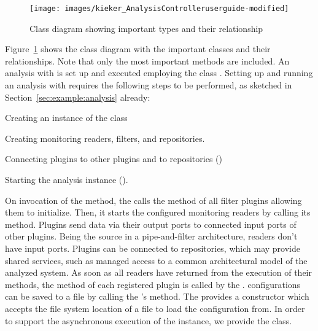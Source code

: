 \begin{figure}\centering
\texttt{[image: images/kieker\_AnalysisControlleruserguide-modified]}
\caption{Class diagram showing important \KiekerAnalysisPart{} types and their relationship}
\label{fig:analysisController:classdiagram}
\end{figure}


\noindent Figure~\ref{fig:analysisController:classdiagram} shows the class diagram %
with the important \KiekerAnalysisPart{} classes and their relationships. %
Note that only the most important methods are included. 
An analysis with \KiekerAnalysisPart{} is set up and executed employing %
the class . %
Setting up and running an analysis with \KiekerAnalysisPart{} requires the %
following steps to be performed, as sketched in Section~\ref{sec:example:analysis} already:

\enlargethispage{1.2cm}

\medskip

\begin{compactenum}
\item Creating an instance of the  class
\item Creating monitoring readers, filters, and repositories.
\item Connecting plugins to other plugins and to repositories ()
\item Starting the analysis instance ().
\end{compactenum}

\medskip

\noindent On invocation of the  method, the  %
calls the  method of all filter plugins allowing them to initialize. %
Then, it starts the configured monitoring readers by calling its  %
method. Plugins send data via their output ports to connected input ports of other
plugins. Being the source in a pipe-and-filter architecture, readers don't have %
input ports. Plugins can be connected to repositories, which may provide %
shared services, such as managed access to a common architectural model %
of the analyzed system. As soon as all readers have returned from the execution of their 
methods, the method  of each registered plugin is called by the %
. \KiekerAnalysisPart{} configurations can be saved %
to a  file by calling the 's  method. %
The  provides a constructor which accepts the %
file system location of a  file to load the configuration from. %
In order to support the asynchronous execution of the  instance, %
we provide the  class.

